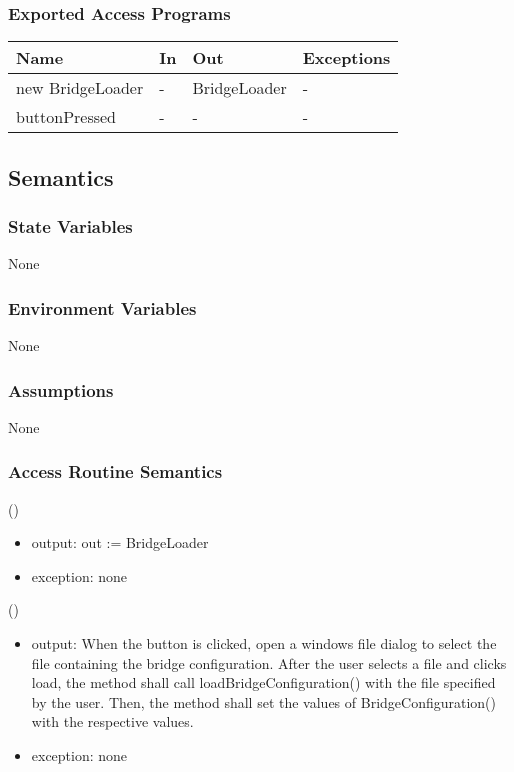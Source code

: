 \documentclass[12pt, titlepage]{article}
\begin{document}
\subsubsection{Exported Access Programs}
\begin{center}
\begin{tabular}{p{5cm} p{2cm} p{4cm} p{5.5cm}}
\hline
\textbf{Name} & \textbf{In} & \textbf{Out} & \textbf{Exceptions} \\
\hline
new BridgeLoader & - & BridgeLoader & - \\
\hline
buttonPressed & - & - & - \\
\hline
\end{tabular}
\end{center}

\subsection{Semantics}

\subsubsection{State Variables}
None
\subsubsection{Environment Variables}
None
\subsubsection{Assumptions}
None
\subsubsection{Access Routine Semantics}

()
\begin{itemize}
\item output: out :=  BridgeLoader
\item exception: none
\end{itemize}

()
\begin{itemize}
\item output: When the button is clicked, open a windows file dialog to select the file containing the bridge configuration. After the user selects a file and clicks load, the method shall call loadBridgeConfiguration() with the file specified by the user. Then, the method shall set the values of BridgeConfiguration() with the respective values.
\item exception: none
\end{itemize}
\end{document}
